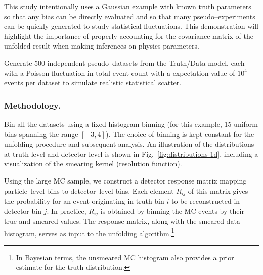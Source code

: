         This study intentionally uses a Gaussian example with known truth parameters so that any bias can be directly evaluated and so that many pseudo--experiments can be quickly generated to study statistical fluctuations.
        This demonstration will highlight the importance of properly accounting for the covariance matrix of the unfolded result when making inferences on physics parameters.
        
        Generate 500 independent pseudo--datasets from the Truth/Data model, each with a Poisson fluctuation in total event count with a expectation value of $10^4$ events per dataset to simulate realistic statistical scatter.
        
        \subsubsection{Methodology.}
        \label{subsec:methodology}
            Bin all the datasets using a fixed histogram binning (for this example, 15 uniform bins spanning the range $[-3,4]$).
            The choice of binning is kept constant for the unfolding procedure and subsequent analysis.
            An illustration of the distributions at truth level and detector level is shown in Fig.~\ref{fig:distributions-1d}, including a visualization of the smearing kernel (resolution function).
            
            Using the large MC sample, we construct a detector response matrix mapping particle--level bins to detector--level bins.
            Each element $R_{ij}$ of this matrix gives the probability for an event originating in truth bin $i$ to be reconstructed in detector bin $j$.
            In practice, $R_{ij}$ is obtained by binning the MC events by their true and smeared values.
            The response matrix, along with the smeared data histogram, serves as input to the unfolding algorithm.\footnote{In Bayesian terms, the unsmeared MC histogram also provides a prior estimate for the truth distribution.}
    
